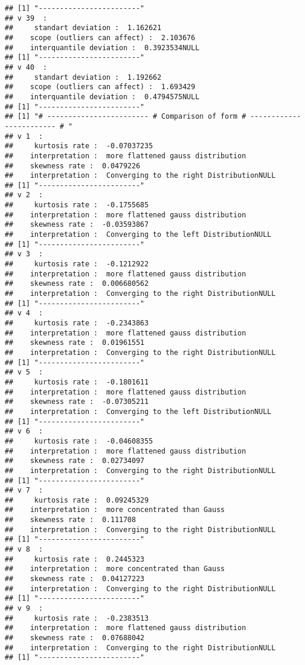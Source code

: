 \documentclass[]{article}
\begin{document}
\begin{verbatim}
## [1] "------------------------"
## v 39  : 
##     standart deviation :  1.162621 
##    scope (outliers can affect) :  2.103676 
##    interquantile deviation :  0.3923534NULL
## [1] "------------------------"
## v 40  : 
##     standart deviation :  1.192662 
##    scope (outliers can affect) :  1.693429 
##    interquantile deviation :  0.4794575NULL
## [1] "------------------------"
## [1] "# ------------------------ # Comparison of form # ------------------------ # "
## v 1  : 
##     kurtosis rate :  -0.07037235 
##    interpretation :  more flattened gauss distribution 
##    skewness rate :  0.0479226 
##    interpretation :  Converging to the right DistributionNULL
## [1] "------------------------"
## v 2  : 
##     kurtosis rate :  -0.1755685 
##    interpretation :  more flattened gauss distribution 
##    skewness rate :  -0.03593867 
##    interpretation :  Converging to the left DistributionNULL
## [1] "------------------------"
## v 3  : 
##     kurtosis rate :  -0.1212922 
##    interpretation :  more flattened gauss distribution 
##    skewness rate :  0.006680562 
##    interpretation :  Converging to the right DistributionNULL
## [1] "------------------------"
## v 4  : 
##     kurtosis rate :  -0.2343863 
##    interpretation :  more flattened gauss distribution 
##    skewness rate :  0.01961551 
##    interpretation :  Converging to the right DistributionNULL
## [1] "------------------------"
## v 5  : 
##     kurtosis rate :  -0.1801611 
##    interpretation :  more flattened gauss distribution 
##    skewness rate :  -0.07305211 
##    interpretation :  Converging to the left DistributionNULL
## [1] "------------------------"
## v 6  : 
##     kurtosis rate :  -0.04608355 
##    interpretation :  more flattened gauss distribution 
##    skewness rate :  0.02734097 
##    interpretation :  Converging to the right DistributionNULL
## [1] "------------------------"
## v 7  : 
##     kurtosis rate :  0.09245329 
##    interpretation :  more concentrated than Gauss 
##    skewness rate :  0.111708 
##    interpretation :  Converging to the right DistributionNULL
## [1] "------------------------"
## v 8  : 
##     kurtosis rate :  0.2445323 
##    interpretation :  more concentrated than Gauss 
##    skewness rate :  0.04127223 
##    interpretation :  Converging to the right DistributionNULL
## [1] "------------------------"
## v 9  : 
##     kurtosis rate :  -0.2383513 
##    interpretation :  more flattened gauss distribution 
##    skewness rate :  0.07688042 
##    interpretation :  Converging to the right DistributionNULL
## [1] "------------------------"

\end{verbatim}
\end{document}
